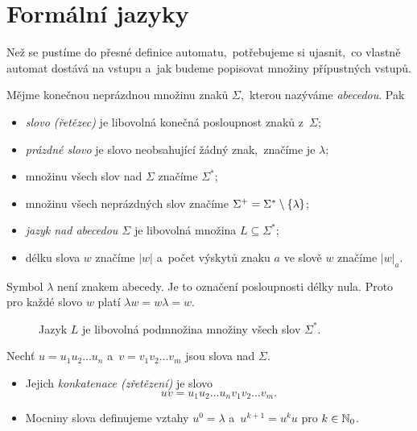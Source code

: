 \section{Formální jazyky}\label{sec:jazyky}

Než se pustíme do přesné definice automatu,~potřebujeme si ujasnit,~co vlastně automat dostává na vstupu a~jak budeme popisovat množiny přípustných vstupů.

\begin{definition}
    Mějme konečnou neprázdnou množinu znaků $\Sigma$,~kterou nazýváme \emph{abecedou}. Pak
    \begin{itemize}
        \item \emph{slovo (řetězec)} je libovolná konečná posloupnost znaků z~$\Sigma$;
        \item \emph{prázdné slovo} je slovo neobsahující žádný znak,~značíme je $\lambda$;
        \item množinu všech slov nad $\Sigma$ značíme $\Sigma^*$;
        \item množinu všech neprázdných slov značíme $\Sigma^+=\Sigma^*\setminus\left\{\lambda\right\}$;
        \item \emph{jazyk nad abecedou $\Sigma$} je libovolná množina $L\subseteq\Sigma^*$;
        \item délku slova $w$ značíme $|w|$ a~počet výskytů znaku $a$ ve slově $w$ značíme $|w|_a$.
    \end{itemize}
\end{definition}

Symbol $\lambda$ není znakem abecedy. Je to označení posloupnosti délky nula. Proto pro každé slovo $w$ platí $\lambda w=w\lambda=w$.

\begin{figure}[h]
    \centering
    
    \caption{Jazyk $L$ je libovolná podmnožina množiny všech slov $\Sigma^*$.}
    \label{fig:jazyk}
\end{figure}

\begin{definition}
    Nechť $u=u_1u_2\dots u_n$ a~$v=v_1v_2\dots v_m$ jsou slova nad $\Sigma$.
    \begin{itemize}
        \item Jejich \emph{konkatenace (zřetězení)} je slovo
        \[uv=u_1u_2\dots u_nv_1v_2\dots v_m.\]
        \item Mocniny slova definujeme vztahy $u^0=\lambda$ a~$u^{k+1}=u^ku$ pro $k\in\mathbb{N}_0$.
    \end{itemize}
\end{definition}

